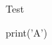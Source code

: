 \documentclass{beamer}
\begin{document}
\begin{frame}[fragile]{Test}

\ifdefined\TestAll

\begin{python}
print('A')
\end{python}

\fi

\end{frame}
\end{document}
